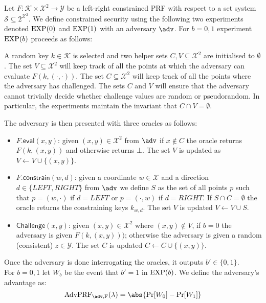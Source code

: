 		\begin{secgame} \label{att:lrPRF}
		Let $F: \mathcal{K} \times \mathcal{X}^2 \rightarrow \mathcal{Y}$ be a left-right constrained PRF with respect to a set system $\mathcal{S} \subseteq 2^{\mathcal{X}^2}$. We define constrained security using the following two experiments denoted $\mathrm{EXP}({0})$ and $\mathrm{EXP}({1})$ with an adversary $\adv$. For $b=0,1$ experiment $\mathrm{EXP}({b})$ proceeds as follows:

			A random key $k \in \mathcal{K}$ is selected and two helper sets $C,V \subseteq \mathcal{X}^2$ are initialised to $\emptyset$. The set $V \subseteq \mathcal{X}^2$ will keep track of all the points at which the adversary can evaluate $F(k, (\cdot,\cdot))$. The set $C \subseteq \mathcal{X}^2$ will keep track of all the points where the adversary has challenged. The sets $C$ and $V$ will ensure that the adversary cannot trivially decide whether challenge values are random or pseudorandom. In particular, the experiments maintain the invariant that $C \cap V = \emptyset$.

The adversary is then presented with three oracles as follows:

\begin{itemize}
	\item $F.\mathsf{eval}(x,y)$: given $(x,y) \in \mathcal{X}^2$ from $\adv$ if $x \notin C$ the oracle returns $F(k, (x,y))$ and otherwise returns $\bot$. The set $V$ is updated as $V\leftarrow V \cup \{(x,y)\}$.
	\item $F.\mathsf{constrain}(w,d)$: given a coordinate $w \in \mathcal{X}$ and a direction $d \in \{LEFT,RIGHT\}$ from $\adv$ we define $S$ as the set of all points $p$ such that $p = (w, \cdot)$ if $d=LEFT$ or $p = (\cdot, w)$ if $d=RIGHT$. If $S\cap C= \emptyset$ the oracle returns the constraining keys $k_{w, d}$. The set $V$ is updated $V\leftarrow V \cup S$.
	\item $\mathsf{Challenge}(x,y)$: given $(x,y)\in \mathcal{X}^2$ where $(x,y) \notin V$, if $b=0$ the adversary is given $F(k, (x,y)))$; otherwise the adversary is given a random (consistent) $z \in \mathcal{Y}$. The set $C$ is updated $C \leftarrow C \cup \{(x,y)\}$.
\end{itemize}
			Once the adversary is done interrogating the oracles, it outputs $b' \in \{0,1\}$.\\
			
			\noindent For $b = 0,1$ let $W_b$ be the event that $b'=1$ in $\mathrm{EXP}({b})$. We define the adversary's advantage as: \begin{equation} \label{eq:advLRPRF}
				\mathrm{AdvPRF_{\adv, F}}(\lambda) = \abs{\mathrm{Pr}[W_0] - \mathrm{Pr}[W_1]}
			\end{equation}
		\end{secgame}
		
